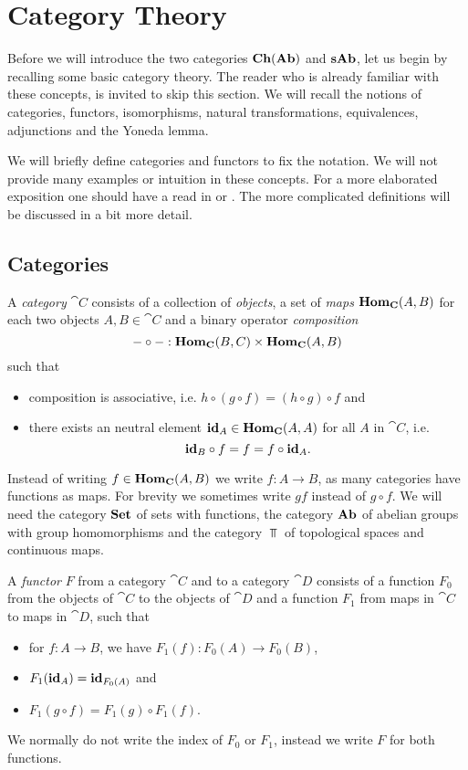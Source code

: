 \section{Category Theory}
\label{sec:Category Theory}
Before we will introduce the two categories $\mathbf{Ch}(\mathbf{Ab})$ and $\mathbf{sAb}$, let us begin by recalling some basic category theory. The reader who is already familiar with these concepts, is invited to skip this section. We will recall the notions of categories, functors, isomorphisms, natural transformations, equivalences, adjunctions and the Yoneda lemma.

We will briefly define categories and functors to fix the notation. We will not provide many examples or intuition in these concepts. For a more elaborated exposition one should have a read in \cite{awodey} or \cite{maclane}. The more complicated definitions will be discussed in a bit more detail.

\subsection{Categories}
\begin{definition}
	A \emph{category} $\cat{C}$ consists of a collection of \emph{objects}, a set of \emph{maps} $\mathbf{Hom}_{\mathbf{C}}(A, B)$ for each two objects $A, B \in \cat{C}$ and a binary operator \emph{composition} 
	$$-\circ-:\mathbf{Hom}_{\mathbf{C}}(B, C) \times \mathbf{Hom}_{\mathbf{C}}(A, B)$$
	such that
	\begin{itemize}
		\item composition is associative, i.e. $h \circ (g \circ f) = (h \circ g) \circ f$ and
		\item there exists an neutral element $\mathbf{id}_A \in \mathbf{Hom}_{\mathbf{C}}(A, A)$ for all $A$ in $\cat{C}$, i.e.
		$$ \mathbf{id}_B \circ f = f = f \circ \mathbf{id}_A. $$
	\end{itemize}
\end{definition}

Instead of writing $f \in \mathbf{Hom}_{\mathbf{C}}(A, B)$ we write $f: A \to B$, as many categories have functions as maps. For brevity we sometimes write $gf$ instead of $g \circ f$. We will need the category $\mathbf{Set}$ of sets with functions, the category $\mathbf{Ab}$ of abelian groups with group homomorphisms and the category $\Top$ of topological spaces and continuous maps.

\begin{definition}
	A \emph{functor} $F$ from a category $\cat{C}$ and to a category $\cat{D}$ consists of a function $F_0$ from the objects of $\cat{C}$ to the objects of $\cat{D}$ and a function $F_1$ from maps in $\cat{C}$ to maps in $\cat{D}$, such that
	\begin{itemize}
		\item for $f: A \to B$, we have $F_1(f): F_0(A) \to F_0(B)$,
		\item $F_1(\mathbf{id}_A) = \mathbf{id}_{F_0(A)}$ and
		\item $F_1(g \circ f) = F_1(g) \circ F_1(f)$.
	\end{itemize}
	We normally do not write the index of $F_0$ or $F_1$, instead we write $F$ for both functions.
\end{definition}

